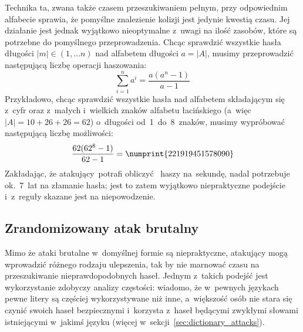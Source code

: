 Technika ta, zwana także czasem przeszukiwaniem pełnym, przy odpowiednim
alfabecie sprawia, że pomyślne znalezienie kolizji jest jedynie kwestią czasu.
Jej działanie jest jednak wyjątkowo nieoptymalne z~uwagi na ilość zasobów,
które są potrzebne do pomyślnego przeprowadzenia. Chcąc sprawdzić wszystkie
hasła długości \mbox{$|m| \in (1, \ldots n)$} nad alfabetem długości $a=|A|$,
musimy przeprowadzić następującą liczbę operacji haszowania:
    $$\sum_{i=1}^n a^i = \frac{a(a^n-1)}{a-1}$$
Przykładowo, chcąc sprawdzić wszystkie hasła nad alfabetem składającym się
z~cyfr oraz z~małych i~wielkich znaków alfabetu łacińskiego (a~więc $|A| =
10+26+26 = 62$) o~długości od~1~do~8~znaków, musimy wypróbować następującą
liczbę możliwości:
    $$\frac{62(62^8-1)}{62-1} = \numprint{221919451578090}$$
Zakładając, że atakujący~potrafi obliczyć ~haszy na~sekundę,
nadal potrzebuje ok.~7~lat na złamanie hasła; jest to zatem wyjątkowo
niepraktyczne podejście i~z~reguły skazane jest na niepowodzenie.



\subsection{Zrandomizowany atak brutalny}
Mimo że ataki brutalne w~domyślnej formie są niepraktyczne, atakujący mogą
wprowadzić różnego rodzaju ulepszenia, tak by nie marnować czasu na
przeszukiwanie nieprawdopodobnych haseł. Jednym z~takich podejść jest
wykorzystanie zdobyczy analizy częstości: wiadomo, że w~pewnych językach pewne
litery są częściej wykorzystywane niż inne, a~większość osób nie stara się
czynić swoich haseł bezpiecznymi i~korzysta z~haseł będącymi zwykłymi słowami
istniejącymi w~jakimś języku (więcej w~sekcji~\ref{sec:dictionary_attacks}).

